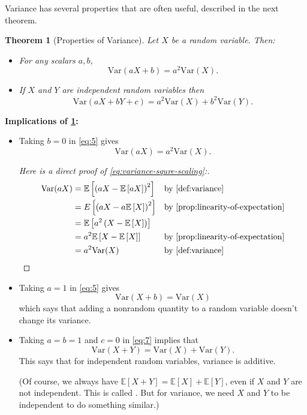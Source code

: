\documentclass[10pt]{article}
\newtheorem{theorem}{Theorem}
\theoremstyle{definition}
\newcommand{\fl}{\noindent\textbf} %
\newcommand{\1}[1]{\textbf{1}_{\left[#1\right]}} %
\def\E{\mathbb{E}} %
\def\Var{\mathrm{Var}} %
\newcommand{\dempfcolor}[1]{{\color{RoyalBlue}#1}}
\newcommand{\demph}[1]{\dempfcolor{{\sl \textbf{#1}}}}
\begin{document}
Variance has several properties that are often useful, described in the next
theorem.

\begin{theorem}[Properties of Variance]
  \label{thm:variance-properties}
  Let $X$ be a random variable. Then:
  \begin{itemize}
    \item For any scalars $a,b$,
    \begin{equation}\label{eq:5}
      \Var(aX+b) = a^{2}\Var(X).
    \end{equation}
    \item If $X$ and $Y$ are independent random variables then
    \begin{equation}\label{eq:7}
      \Var(aX+bY+c) = a^{2}\Var(X)+b^{2}\Var(Y).
    \end{equation}
  \end{itemize}
\end{theorem}
\fl{Implications of \cref{thm:variance-properties}:}
\begin{itemize}
  \item Taking $b=0$ in \cref{eq:5} gives
  \begin{equation}\label{eq:variance-squre-scaling}
    \Var(aX) = a^{2}\Var(X).
  \end{equation}
  \begin{proof}[Here is a direct proof of \cref{eq:variance-squre-scaling}:]
    \begin{align*}
      \Var(aX)
      &= \E\left[\left( aX- \E\left[aX \right] \right)^{2}  \right]
      &&\text{by \cref{def:variance}}\\
      &= E\left[  \left( aX- a\E\left[X \right] \right)^{2}  \right]
      &&\text{by \cref{prop:linearity-of-expectation}}\\
      &= \E\left[a^{2}\left(X- \E\left[X \right]  \right)  \right]\\
      &= a^{2} \E\left[ X- \E\left[X \right]   \right] &&\text{by \cref{prop:linearity-of-expectation}}\\
      &= a^{2}\Var(X) &&\text{by \cref{def:variance} }
    \end{align*}
  \end{proof}
  \item Taking $a=1$ in \cref{eq:5} gives
  \begin{equation*}
    \Var(X+b) = \Var(X)
  \end{equation*}
  which says that adding a nonrandom quantity to a random variable doesn't
  change its variance.
  \item Taking $a=b=1$ and $c=0$ in \cref{eq:7} implies that
  \begin{equation}\label{eq:additivity-of-variance}
    \Var(X+ Y) = \Var(X) + \Var(Y).
  \end{equation}
  This says that for independent random variables, variance is additive.

  (Of course, we always have
  $\E\left[X+Y \right] = \E\left[X \right]+ \E\left[Y \right]$, even if $X$
  and $Y$ are not independent. This is called \demph{linearity of
    expectation}. But for variance, we need $X$ and $Y$ to be independent to
  do something similar.)
\end{itemize}
\end{document}
